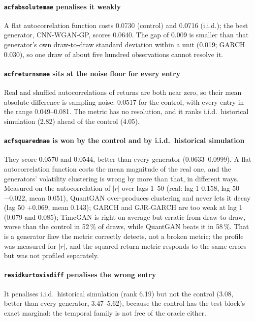 \documentclass[11pt,a4paper]{article}
\makeatletter
\DeclareRobustCommand{\_}{\ifmmode\nfss@text{\textunderscore}\else\textunderscore\allowbreak\fi}
\makeatother
\begin{document}
\paragraph{\texttt{acf\_absolute\_mae} penalises it weakly} A flat autocorrelation function costs 0.0730 (control) and 0.0716 (i.i.d.); the best generator, CNN-WGAN-GP, scores 0.0640. The gap of 0.009 is smaller than that generator's own draw-to-draw standard deviation within a unit (0.019; GARCH 0.030), so one draw of about five hundred observations cannot resolve it.

\paragraph{\texttt{acf\_returns\_mae} sits at the noise floor for every entry} Real and shuffled autocorrelations of returns are both near zero, so their mean absolute difference is sampling noise: 0.0517 for the control, with every entry in the range 0.049--0.081. The metric has no resolution, and it ranks i.i.d.\ historical simulation (2.82) ahead of the control (4.05).

\paragraph{\texttt{acf\_squared\_mae} is won by the control and by i.i.d.\ historical simulation} They score 0.0570 and 0.0544, better than every generator (0.0633--0.0999). A flat autocorrelation function costs the mean magnitude of the real one, and the generators' volatility clustering is wrong by more than that, in different ways. Measured on the autocorrelation of $|r|$ over lags 1--50 (real: lag 1 0.158, lag 50 $-0.022$, mean 0.051), QuantGAN over-produces clustering and never lets it decay (lag 50 $+0.069$, mean 0.143); GARCH and GJR-GARCH are too weak at lag 1 (0.079 and 0.085); TimeGAN is right on average but erratic from draw to draw, worse than the control in 52\,\% of draws, while QuantGAN beats it in 58\,\%. That is a generator flaw the metric correctly detects, not a broken metric; the profile was measured for $|r|$, and the squared-return metric responds to the same errors but was not profiled separately.

\paragraph{\texttt{resid\_kurtosis\_diff} penalises the wrong entry} It penalises i.i.d.\ historical simulation (rank 6.19) but not the control (3.08, better than every generator, 3.47--5.62), because the control has the test block's exact marginal: the temporal family is not free of the oracle either.
\end{document}
